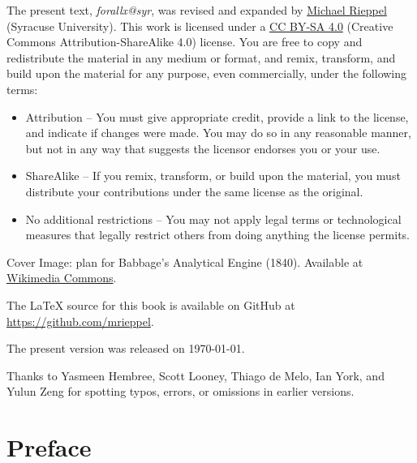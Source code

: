 \vspace{1ex}

\noindent The present text, \emph{forallx@syr}, was revised and expanded by \href{https://mrieppel.net/}{Michael Rieppel} (Syracuse University).  This work is licensed under a \href{https://creativecommons.org/licenses/by-sa/4.0/}{CC BY-SA 4.0} (Creative Commons Attribution-ShareAlike 4.0) license.  You are free to copy and redistribute the material in any medium or format, and  remix, transform, and build upon the material for any purpose, even commercially, under the following terms:
\begin{itemize}
\item Attribution -- You must give appropriate credit, provide a link to the license, and indicate if changes were made. You may do so in any reasonable manner, but not in any way that suggests the licensor endorses you or your use.

\item ShareAlike -- If you remix, transform, or build upon the material, you must distribute your contributions under the same license as the original.

\item No additional restrictions -- You may not apply legal terms or technological measures that legally restrict others from doing anything the license permits.
\end{itemize}

\vspace{1ex}
\noindent Cover Image: plan for Babbage's Analytical Engine (1840). Available at \href{https://commons.wikimedia.org/wiki/File:Babbage_Analytical_Engine_Plan_1840_CHM.agr.jpg}{Wikimedia Commons}.

\vspace{1ex}

\noindent The \LaTeX{} source for this book is available on GitHub at \href{https://github.com/mrieppel}{https://github.com/mrieppel}. 

\vspace{1ex}

\noindent The present version was released on \today.

\vspace{1ex}
\noindent Thanks to Yasmeen Hembree, Scott Looney, Thiago de Melo, Ian York, and Yulun Zeng for spotting typos, errors, or omissions in earlier versions.

\newpage
\normalsize
\chapter*{Preface}


